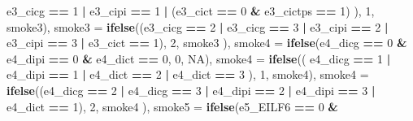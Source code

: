 \documentclass[]{book}
\newenvironment{Shaded}{\begin{snugshade}}{\end{snugshade}}
\newcommand{\DataTypeTok}[1]{\textcolor[rgb]{0.13,0.29,0.53}{#1}}
\newcommand{\DecValTok}[1]{\textcolor[rgb]{0.00,0.00,0.81}{#1}}
\newcommand{\KeywordTok}[1]{\textcolor[rgb]{0.13,0.29,0.53}{\textbf{#1}}}
\newcommand{\NormalTok}[1]{#1}
\newcommand{\OperatorTok}[1]{\textcolor[rgb]{0.81,0.36,0.00}{\textbf{#1}}}
\newcommand{\OtherTok}[1]{\textcolor[rgb]{0.56,0.35,0.01}{#1}}
\newcommand{\StringTok}[1]{\textcolor[rgb]{0.31,0.60,0.02}{#1}}
\begin{document}
\begin{Shaded}
\begin{Highlighting}[]
{\NormalTok{      e3_cicg }\OperatorTok{==}\StringTok{ }\DecValTok{1} \OperatorTok{|}
\StringTok{        }\NormalTok{e3_cipi }\OperatorTok{==}\StringTok{ }\DecValTok{1} \OperatorTok{|}\StringTok{ }\NormalTok{(e3_cict }\OperatorTok{==}\StringTok{ }\DecValTok{0} \OperatorTok{&}\StringTok{ }\NormalTok{e3_cictps }\OperatorTok{==}\StringTok{ }\DecValTok{1}\NormalTok{)}
\NormalTok{    ), }\DecValTok{1}\NormalTok{, smoke3),}
    \DataTypeTok{smoke3 =} \KeywordTok{ifelse}\NormalTok{((e3_cicg }\OperatorTok{==}\StringTok{ }\DecValTok{2} \OperatorTok{|}
\StringTok{                       }\NormalTok{e3_cicg }\OperatorTok{==}\StringTok{ }\DecValTok{3} \OperatorTok{|}\StringTok{ }\NormalTok{e3_cipi }\OperatorTok{==}\StringTok{ }\DecValTok{2} \OperatorTok{|}\StringTok{ }\NormalTok{e3_cipi }\OperatorTok{==}\StringTok{ }\DecValTok{3} \OperatorTok{|}\StringTok{ }\NormalTok{e3_cict }\OperatorTok{==}\StringTok{ }\DecValTok{1}\NormalTok{),}
                    \DecValTok{2}\NormalTok{,}
\NormalTok{                    smoke3}
\NormalTok{    ),}
    \DataTypeTok{smoke4 =} \KeywordTok{ifelse}\NormalTok{(e4_dicg }\OperatorTok{==}\StringTok{ }\DecValTok{0} \OperatorTok{&}
\StringTok{                      }\NormalTok{e4_dipi }\OperatorTok{==}\StringTok{ }\DecValTok{0} \OperatorTok{&}\StringTok{ }\NormalTok{e4_dict }\OperatorTok{==}\StringTok{ }\DecValTok{0}\NormalTok{, }\DecValTok{0}\NormalTok{, }\OtherTok{NA}\NormalTok{),}
    \DataTypeTok{smoke4 =} \KeywordTok{ifelse}\NormalTok{((}
\NormalTok{      e4_dicg }\OperatorTok{==}\StringTok{ }\DecValTok{1} \OperatorTok{|}
\StringTok{        }\NormalTok{e4_dipi }\OperatorTok{==}\StringTok{ }\DecValTok{1} \OperatorTok{|}\StringTok{ }\NormalTok{e4_dict }\OperatorTok{==}\StringTok{ }\DecValTok{2} \OperatorTok{|}\StringTok{ }\NormalTok{e4_dict }\OperatorTok{==}\StringTok{ }\DecValTok{3}
\NormalTok{    ), }\DecValTok{1}\NormalTok{, smoke4),}
    \DataTypeTok{smoke4 =} \KeywordTok{ifelse}\NormalTok{((e4_dicg }\OperatorTok{==}\StringTok{ }\DecValTok{2} \OperatorTok{|}
\StringTok{                       }\NormalTok{e4_dicg }\OperatorTok{==}\StringTok{ }\DecValTok{3} \OperatorTok{|}\StringTok{ }\NormalTok{e4_dipi }\OperatorTok{==}\StringTok{ }\DecValTok{2} \OperatorTok{|}\StringTok{ }\NormalTok{e4_dipi }\OperatorTok{==}\StringTok{ }\DecValTok{3} \OperatorTok{|}\StringTok{ }\NormalTok{e4_dict }\OperatorTok{==}\StringTok{ }\DecValTok{1}\NormalTok{),}
                    \DecValTok{2}\NormalTok{,}
\NormalTok{                    smoke4}
\NormalTok{    ),}
    \DataTypeTok{smoke5 =} \KeywordTok{ifelse}\NormalTok{(e5_EILF6 }\OperatorTok{==}\StringTok{ }\DecValTok{0} \OperatorTok{&}
}
\end{Highlighting}
\end{Shaded}
\end{document}
